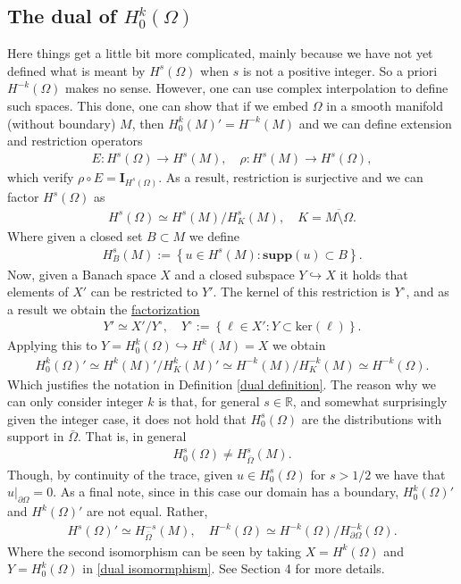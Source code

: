 \documentclass[
    a4paper,
    DIV=14,
    abstract=true,
    numbers=noenddot
]
{scrartcl}
\theoremstyle{definition}
\newcommand{\set}[1]{\left\{#1\right\}}
\newcommand{\Id}{\bm{I}}\renewcommand{\ker}{\rm{ker}}\newcommand{\supp}[1]{\bm{supp}(#1)}\renewcommand{\tr}[1]{\mathrm{tr}\left(#1\right)}
\newcommand\restr[2]{\left.#1\right|_{#2}}
\newcommand{\rm}[1]{\mathrm{#1}}
\newcommand{\R}{\mathbb{R}}
\begin{document}
\subsection{The dual of $H^k_0(\Omega)$}
Here things get a little bit more complicated, mainly because we have not yet defined what is meant by
$H^s(\Omega)$ when $s$ is not a positive integer. So a priori $H^{-k}(\Omega)$ makes no sense. However, one can use complex interpolation to define such spaces. This done, one can show that if we embed $\Omega$ in a smooth manifold (without boundary) $M$, then $H_0^k(M)'=H^{-k}(M)$ and we can define extension and restriction operators
\begin{align*}
	E:H^s(\Omega ) \to H^s(M), \quad \rho: H^s(M) \to H^s(\Omega ),
\end{align*}
which verify $\rho \circ E = \Id_{H^s(\Omega )}$. As a result, restriction is surjective and we can factor $H^s(\Omega )$ as
\begin{align}\label{ismorphism}
	H^s(\Omega )\simeq H^s(M)\slash H^s_K(M ), \quad K=\overline{M\setminus \Omega }.
\end{align}
Where given a closed set $B\subset M$ we define
\begin{align*}
	H^s_B(M):= \set{u \in H^s(M): \supp{u} \subset B}.
\end{align*}
Now, given a Banach space $X$ and a closed subspace $Y \hookrightarrow X$ it holds that elements of $X'$ can be restricted to $Y'$. The kernel of this restriction is $Y^\circ$, and as a result we obtain the \href{https://math.la.asu.edu/~quigg/teach/courses/578/2008/notes/adjoints.pdf}{factorization}
\begin{align}\label{dual isomormphism}
	Y' \simeq X'\slash Y^\circ, \quad Y^\circ:= \set{\ell \in X': Y \subset \rm{ker}(\ell)}.
\end{align}
Applying this to $Y= H^k_0(\Omega )\hookrightarrow H^k(M) =X$ we obtain
\begin{align*}
	H^{k}_0(\Omega )' \simeq H^{k}(M)'\slash H^{k}_K(M)'\simeq H^{-k}(M)\slash H^{-k}_K(M )\simeq H^{-k}(\Omega ).
\end{align*}
Which justifies the notation in Definition \ref{dual definition}. The reason why we can only consider
integer $k$ is that, for general $s \in \R$, and somewhat surprisingly given the integer case, it does not hold that $H^s_0(\Omega )$ are the distributions with support in $\bar{\Omega}$. That is, in general
\begin{align*}
	H^s_0(\Omega )\neq H^{s}_{\overline{\Omega } }(M).
\end{align*}
Though, by continuity of the trace, given  $ u \in H^s_0(\Omega )$ for $s>1/2$ we have that $\restr{u}{\partial \Omega } =0$.
As a final note, since in this case our domain has a boundary, $H_0^k(\Omega )'$ and $H^k(\Omega )'$ are not equal. Rather,
\begin{align*}
	H^s(\Omega )'\simeq H_{\overline{\Omega } }^{-s}(M), \quad H^{-k}(\Omega ) \simeq H^{-k}(\Omega )\slash H_{\partial \Omega }^{-k}(\Omega ).
\end{align*}
Where the second isomorphism can be seen by taking $X=H^k(\Omega )$ and $Y=H^k_{0 }(\Omega )$ in \eqref{dual isomormphism}. See \cite{taylor2013partial} Section 4 for more details.
\end{document}
